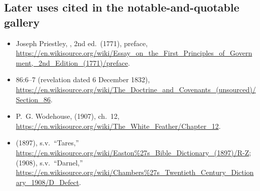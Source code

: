 \subsection*{Later uses cited in the notable-and-quotable gallery}

\begin{itemize}
\item Joseph Priestley, ,
  2nd ed.\ (1771), preface,
  \url{https://en.wikisource.org/wiki/Essay_on_the_First_Principles_of_Government,_2nd_Edition_(1771)/preface}.
\item {} 86:6--7 (revelation dated 6 December 1832),
  \url{https://en.wikisource.org/wiki/The_Doctrine_and_Covenants_(unsourced)/Section_86}.
\item P.~G. Wodehouse,  (1907), ch.\ 12,
  \url{https://en.wikisource.org/wiki/The_White_Feather/Chapter_12}.
\item {} (1897), s.v.\ ``Tares,''
  \url{https://en.wikisource.org/wiki/Easton\%27s_Bible_Dictionary_(1897)/R-Z};
   (1908), s.v.\ ``Darnel,''
  \url{https://en.wikisource.org/wiki/Chambers\%27s_Twentieth_Century_Dictionary_1908/D_Defect}.
\end{itemize}

\endgroup
